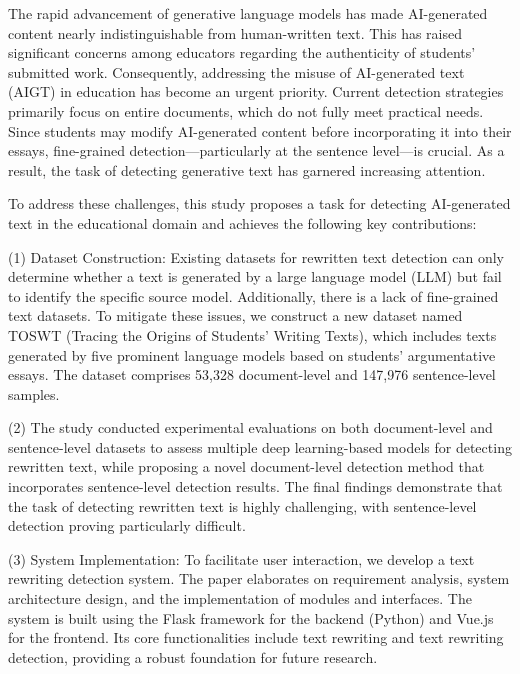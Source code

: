 \begin{abstractEn}
  The rapid advancement of generative language models has made AI-generated content nearly indistinguishable from human-written text. This has raised significant concerns among educators regarding the authenticity of students' submitted work. Consequently, addressing the misuse of AI-generated text (AIGT) in education has become an urgent priority. Current detection strategies primarily focus on entire documents, which do not fully meet practical needs. Since students may modify AI-generated content before incorporating it into their essays, fine-grained detection---particularly at the sentence level---is crucial. As a result, the task of detecting generative text has garnered increasing attention.
  
  To address these challenges, this study proposes a task for detecting AI-generated text in the educational domain and achieves the following key contributions:
  
  (1) Dataset Construction: Existing datasets for rewritten text detection can only determine whether a text is generated by a large language model (LLM) but fail to identify the specific source model. Additionally, there is a lack of fine-grained text datasets. To mitigate these issues, we construct a new dataset named TOSWT (Tracing the Origins of Students' Writing Texts), which includes texts generated by five prominent language models based on students' argumentative essays. The dataset comprises 53,328 document-level and 147,976 sentence-level samples.
  
  (2) The study conducted experimental evaluations on both document-level and sentence-level datasets to assess multiple deep learning-based models for detecting rewritten text, while proposing a novel document-level detection method that incorporates sentence-level detection results. The final findings demonstrate that the task of detecting rewritten text is highly challenging, with sentence-level detection proving particularly difficult.
  
  (3) System Implementation: To facilitate user interaction, we develop a text rewriting detection system. The paper elaborates on requirement analysis, system architecture design, and the implementation of modules and interfaces. The system is built using the Flask framework for the backend (Python) and Vue.js for the frontend. Its core functionalities include text rewriting and text rewriting detection, providing a robust foundation for future research.
\end{abstractEn}
